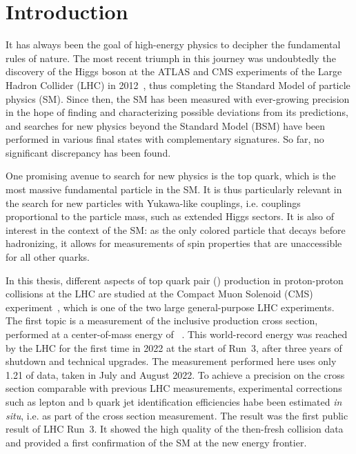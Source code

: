 \chapter{Introduction}
\label{ch:intro}


It has always been the goal of high-energy physics to decipher the fundamental rules of nature. The most recent triumph in this journey was undoubtedly the discovery of the Higgs boson at the ATLAS and CMS experiments of the Large Hadron Collider (LHC) in 2012~\cite{ATLAS:2012tfa,CMS:HIG-12-028,CMS:HIG-12-036}, thus completing the Standard Model of particle physics (SM). Since then, the SM has been measured with ever-growing precision in the hope of finding and characterizing possible deviations from its predictions, and searches for new physics beyond the Standard Model (BSM) have been performed in various final states with complementary signatures. So far, no significant discrepancy has been found.

One promising avenue to search for new physics is the top quark, which is the most massive fundamental particle in the SM. It is thus particularly relevant in the search for new particles with Yukawa-like couplings, i.e. couplings proportional to the particle mass, such as extended Higgs sectors. It is also of interest in the context of the SM: as the only colored particle that decays before hadronizing, it allows for measurements of spin properties that are unaccessible for all other quarks. 

\medskip

In this thesis, different aspects of top quark pair (\ttbar) production in proton-proton collisions at the LHC are studied at the Compact Muon Solenoid (CMS) experiment~\cite{CMS:2008xjf}, which is one of the two large general-purpose LHC experiments. The first topic is a measurement of the inclusive \ttbar production cross section, performed at a center-of-mass energy of \sqrtsRIII~\cite{CMS:TOP-22-012}. This world-record energy was reached by the LHC for the first time in 2022 at the start of Run~3, after three years of shutdown and technical upgrades. The measurement performed here uses only \SI{1.21}{\fbinv} of data, taken in July and August 2022. To achieve a precision on the \ttbar cross section comparable with previous LHC measurements, experimental corrections such as lepton and b quark jet identification efficiencies habe been estimated \textit{in situ}, i.e. as part of the cross section measurement. The result was the first public result of LHC Run~3. It showed the high quality of the then-fresh collision data and provided a first confirmation of the SM at the new energy frontier.

